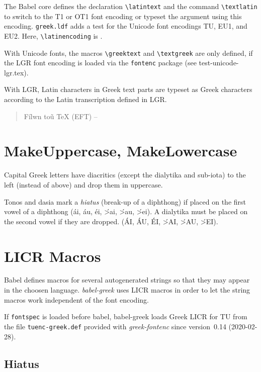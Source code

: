 \documentclass[a4paper]{article}
\begin{document}
The Babel core defines the declaration \verb|\latintext| and the command
\verb|\textlatin| to switch to the T1 or OT1 font encoding or typeset the
argument using this encoding. \texttt{greek.ldf} adds a test for the Unicode
font encodings TU, EU1, and EU2. Here, \verb|\latinencoding| is
\latinencoding.

With Unicode fonts, the macros \verb|\greektext| and \verb|\textgreek| are
only defined, if the LGR font encoding is loaded via the \texttt{fontenc}
package (see test-unicode-lgr.tex).

With LGR, Latin characters in Greek text parts are typeset as Greek characters
according to the Latin transcription defined in LGR.%

\begin{quote}
  \greektext F\'ilwn to\~u \textlatin{TeX} (EFT) --
\end{quote}

\section{MakeUppercase, MakeLowercase}

Capital Greek letters have diacritics (except the dialytika and sub-iota) to
the left (instead of above) and drop them in uppercase.

Tonos and dasia mark a \emph{hiatus} (break-up of a diphthong) if placed on
the first vowel of a diphthong (\textgreek{\'ai, \'au, \'ei, \'>ai, \'>au,
\'>ei}). A dialytika must be placed on the second vowel if they are dropped.
(\foreignlanguage{greek}{\MakeUppercase{\'ai, \'au, \'ei, \'>ai, \'>au,
\'>ei}}).

\section{LICR Macros}

Babel defines macros for several autogenerated strings so that they may
appear in the choosen language. \emph{babel-greek} uses LICR macros in
order to let the string macros work independent of the font encoding.

If \texttt{fontspec} is loaded before babel, babel-greek loads Greek LICR
for TU from the file \texttt{tuenc-greek.def} provided with
\emph{greek-fontenc} since version~0.14 (2020-02-28).

\subsection{Hiatus}
\end{document}
